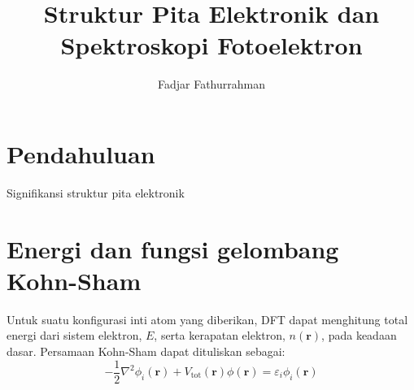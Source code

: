\documentclass[a4paper,bahasa]{paper}
\begin{document}
\title{Struktur Pita Elektronik dan Spektroskopi Fotoelektron}
\author{Fadjar Fathurrahman}
\date{}
\maketitle

\section{Pendahuluan}

Signifikansi struktur pita elektronik

\section{Energi dan fungsi gelombang Kohn-Sham}
%
Untuk suatu konfigurasi inti atom yang diberikan, DFT dapat menghitung
total energi dari sistem elektron, $E$, serta kerapatan elektron, $n(\mathbf{r})$,
pada keadaan dasar. Persamaan Kohn-Sham dapat dituliskan sebagai:
\begin{equation}
-\frac{1}{2}\nabla^2\phi_{i}(\mathbf{r}) + V_{\mathrm{tot}}(\mathbf{r})\phi(\mathbf{r})
= \varepsilon_{i} \phi_{i}(\mathbf{r})
\end{equation}
\end{document}
